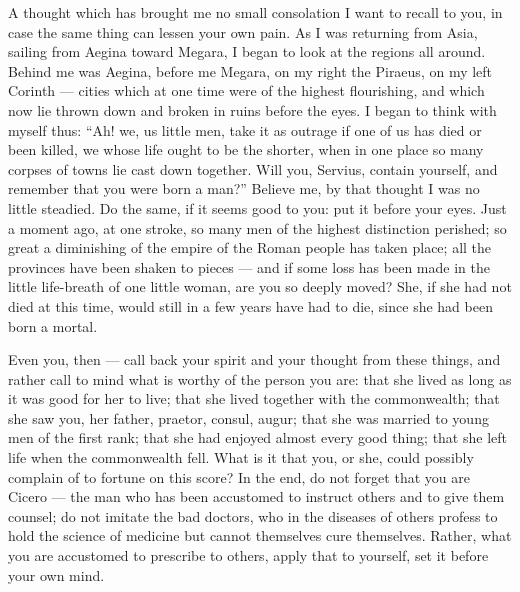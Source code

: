  A thought which has brought me no small consolation I want to recall to you, in case the same thing can lessen your own pain. As I was returning from Asia, sailing from Aegina toward Megara, I began to look at the regions all around. Behind me was Aegina, before me Megara, on my right the Piraeus, on my left Corinth --- cities which at one time were of the highest flourishing, and which now lie thrown down and broken in ruins before the eyes. I began to think with myself thus: ``Ah! we, us little men, take it as outrage if one of us has died or been killed, we whose life ought to be the shorter, when in one place so many corpses of towns lie cast down together. Will you, Servius, contain yourself, and remember that you were born a man?'' Believe me, by that thought I was no little steadied. Do the same, if it seems good to you: put it before your eyes. Just a moment ago, at one stroke, so many men of the highest distinction perished; so great a diminishing of the empire of the Roman people has taken place; all the provinces have been shaken to pieces --- and if some loss has been made in the little life-breath of one little woman, are you so deeply moved? She, if she had not died at this time, would still in a few years have had to die, since she had been born a mortal.

 Even you, then --- call back your spirit and your thought from these things, and rather call to mind what is worthy of the person you are: that she lived as long as it was good for her to live; that she lived together with the commonwealth; that she saw you, her father, praetor, consul, augur; that she was married to young men of the first rank; that she had enjoyed almost every good thing; that she left life when the commonwealth fell. What is it that you, or she, could possibly complain of to fortune on this score? In the end, do not forget that you are Cicero --- the man who has been accustomed to instruct others and to give them counsel; do not imitate the bad doctors, who in the diseases of others profess to hold the science of medicine but cannot themselves cure themselves. Rather, what you are accustomed to prescribe to others, apply that to yourself, set it before your own mind.

